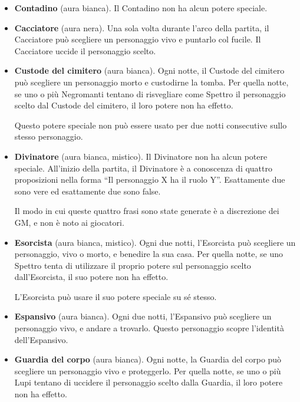 \documentclass[a4paper,10pt]{article}
\begin{document}
\begin{itemize}
 \item {\bf Contadino} (aura bianca). Il Contadino non ha alcun potere speciale.

 \item {\bf Cacciatore} (aura nera). Una sola volta durante l'arco della
partita, il Cacciatore può scegliere un personaggio vivo e puntarlo col fucile.
 Il Cacciatore uccide il personaggio scelto.
 
 \item {\bf Custode del cimitero} (aura bianca). Ogni notte, il Custode del
cimitero può scegliere un personaggio morto e custodirne la tomba. Per quella
notte, se uno o più Negromanti tentano di risvegliare come Spettro il
personaggio scelto dal Custode del cimitero, il loro potere non ha effetto.
 
 Questo potere speciale non può essere usato per due notti consecutive sullo
stesso personaggio.

 \item {\bf Divinatore} (aura bianca, mistico). Il Divinatore non ha alcun
potere speciale. All'inizio della partita, il Divinatore è a conoscenza di
quattro proposizioni nella forma ``Il personaggio X ha il ruolo Y''. Esattamente
due sono vere ed esattamente due sono false.
 
 Il modo in cui queste quattro frasi sono state generate è a discrezione dei GM,
e non è noto ai giocatori.

 \item {\bf Esorcista} (aura bianca, mistico). Ogni due notti, l'Esorcista può
scegliere un personaggio, vivo o morto, e benedire la sua casa.
 Per quella notte, se uno Spettro tenta di utilizzare il proprio potere sul
personaggio scelto dall'Esorcista, il suo potere non ha effetto.
 
 L'Esorcista può usare il suo potere speciale su sé stesso.
 
 \item {\bf Espansivo} (aura bianca). Ogni due notti, l'Espansivo può scegliere
un personaggio vivo, e andare a trovarlo. Questo personaggio scopre l'identità
dell'Espansivo.

 \item {\bf Guardia del corpo} (aura bianca). Ogni notte, la Guardia del corpo
può scegliere un personaggio vivo e proteggerlo. Per quella notte, se uno o più
Lupi tentano di uccidere il personaggio scelto dalla Guardia, il loro potere non
ha effetto.
 

\end{itemize}
\end{document}

